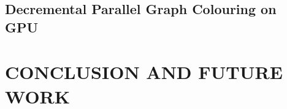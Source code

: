 \documentclass[MTech]{iitmdiss}
\begin{document}
\section{Decremental Parallel Graph Colouring on GPU}
\chapter{CONCLUSION AND FUTURE WORK}

%
%

\pagebreak
\begin{singlespace}
  \begin{small}
	
  \end{small}
\end{singlespace}



%
\end{document}
